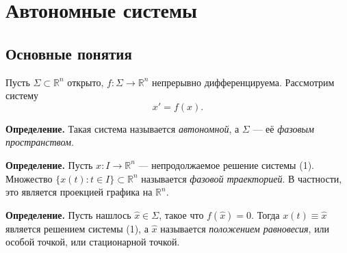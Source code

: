 \section{Автономные системы}
\subsection{Основные понятия}
Пусть $\Sigma \subset \mathbb R^n$ открыто, $f: \Sigma \to \mathbb R^n$ непрерывно дифференцируема.
Рассмотрим систему
\begin{equation}
    x' = f(x).
\end{equation}

\textbf{Определение.} Такая система называется \textit{автономной}, а $\Sigma$ --- её \textit{фазовым пространством}.

\textbf{Определение.} Пусть $x: I \to \mathbb R^n$ --- непродолжаемое решение системы (1).
Множество $\{x(t): t \in I\} \subset \mathbb R^n$ называется \textit{фазовой траекторией}.
В частности, это является проекцией графика на $\mathbb R^n$.

\textbf{Определение.} Пусть нашлось $\widehat x \in \Sigma$, такое что $f(\widehat x) = 0$.
Тогда $x(t) \equiv \widehat x$ является решением системы (1), а $\widehat x$ называется \textit{положением равновесия}, или особой точкой, или стационарной точкой.

